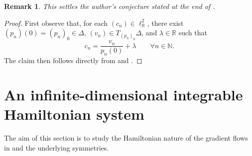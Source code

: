 \documentclass[12pt]{amsart}
\newtheorem{remark}[remark]{Remark}
\numberwithin{figure}{section}
\numberwithin{table}{section}
\numberwithin{equation}{section}
\def\NN{\mathbb{N}}
\def\RR{\mathbb{R}}
\begin{document}
\begin{remark}
This settles the author's conjecture stated at the end of \cite[§3]{Maier_GSI_2026}.
\end{remark}

\begin{proof}
    First observe that, for each $(c_n)\in \ell^2_\RR$, there exist $(p_n)(0)=(p_n)_0\in \Delta$, $(v_n)\in T_{(p_n)_0}\Delta$, and $\lambda\in \RR$ such that
    \[
    c_n = \frac{v_n}{p_n(0)} + \lambda \qquad \forall n\in \NN.
    \]
    The claim then follows directly from  and .
\end{proof}

\section{An infinite-dimensional integrable Hamiltonian system}\label{S: 4}
The aim of this section is to study the Hamiltonian nature of the gradient flows in  and the underlying symmetries.
\end{document}
